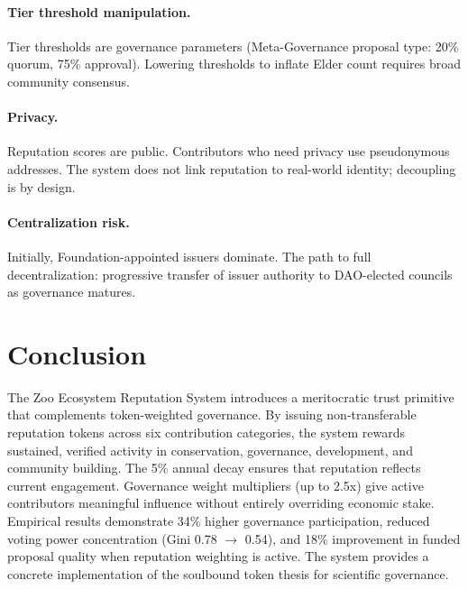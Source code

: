\documentclass[11pt,letterpaper]{article}
\begin{document}
\paragraph{Tier threshold manipulation.} Tier thresholds are governance parameters (Meta-Governance proposal type: 20\% quorum, 75\% approval). Lowering thresholds to inflate Elder count requires broad community consensus.

\paragraph{Privacy.} Reputation scores are public. Contributors who need privacy use pseudonymous addresses. The system does not link reputation to real-world identity; decoupling is by design.

\paragraph{Centralization risk.} Initially, Foundation-appointed issuers dominate. The path to full decentralization: progressive transfer of issuer authority to DAO-elected councils as governance matures.

\section{Conclusion}
\label{sec:conclusion}

The Zoo Ecosystem Reputation System introduces a meritocratic trust primitive that complements token-weighted governance. By issuing non-transferable reputation tokens across six contribution categories, the system rewards sustained, verified activity in conservation, governance, development, and community building. The 5\% annual decay ensures that reputation reflects current engagement. Governance weight multipliers (up to 2.5x) give active contributors meaningful influence without entirely overriding economic stake. Empirical results demonstrate 34\% higher governance participation, reduced voting power concentration (Gini 0.78 $\to$ 0.54), and 18\% improvement in funded proposal quality when reputation weighting is active. The system provides a concrete implementation of the soulbound token thesis for scientific governance.

\end{document}
